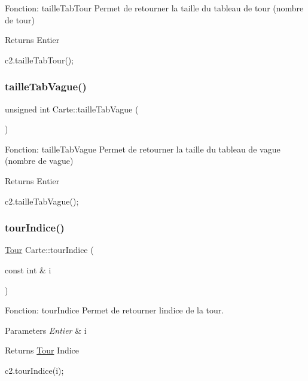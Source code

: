 Fonction\+: taille\+Tab\+Tour Permet de retourner la taille du tableau de tour (nombre de tour) 

\begin{DoxyReturn}{Returns}
Entier 
\begin{DoxyCode}
c2.tailleTabTour();
\end{DoxyCode}
 
\end{DoxyReturn}
\mbox{\label{classCarte_a17cf9a92bb7d81cf3279b50bb40b0891}} 
\subsubsection{\texorpdfstring{taille\+Tab\+Vague()}{tailleTabVague()}}
{\footnotesize\ttfamily unsigned int Carte\+::taille\+Tab\+Vague (\begin{DoxyParamCaption}{ }\end{DoxyParamCaption})}



Fonction\+: taille\+Tab\+Vague Permet de retourner la taille du tableau de vague (nombre de vague) 

\begin{DoxyReturn}{Returns}
Entier 
\begin{DoxyCode}
c2.tailleTabVague();
\end{DoxyCode}
 
\end{DoxyReturn}
\mbox{\label{classCarte_ae4eaa2ff8488218767a9f68232f066d4}} 
\subsubsection{\texorpdfstring{tour\+Indice()}{tourIndice()}}
{\footnotesize\ttfamily \hyperlink{classTour}{Tour} Carte\+::tour\+Indice (\begin{DoxyParamCaption}\item[{const int \&}]{i }\end{DoxyParamCaption})}



Fonction\+: tour\+Indice Permet de retourner l\textquotesingle{}indice de la tour. 


\begin{DoxyParams}{Parameters}
{\em Entier} & i \\
\hline
\end{DoxyParams}
\begin{DoxyReturn}{Returns}
\hyperlink{classTour}{Tour} Indice 
\begin{DoxyCode}
c2.tourIndice(i);
\end{DoxyCode}
 
\end{DoxyReturn}
\mbox{\label{classCarte_a042044f8d54a0f85953a5f61a0d38c86}} 
